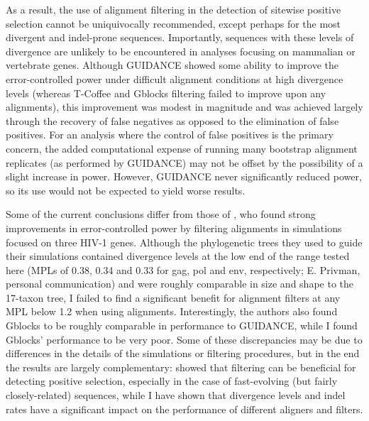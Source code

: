As a result, the use of alignment filtering in the detection of
sitewise positive selection cannot be uniquivocally recommended,
except perhaps for the most divergent and indel-prone
sequences. Importantly, sequences with these levels of divergence are
unlikely to be encountered in analyses focusing on mammalian or
vertebrate genes. Although GUIDANCE showed some ability to improve the
error-controlled power under difficult alignment conditions at high
divergence levels (whereas T-Coffee and Gblocks filtering failed to
improve upon any \prankc alignments), this improvement was modest in
magnitude and was achieved largely through the recovery of false
negatives as opposed to the elimination of false positives. For an
analysis where the control of false positives is the primary concern,
the added computational expense of running many bootstrap alignment
replicates (as performed by GUIDANCE) may not be offset by the
possibility of a slight increase in power. However, GUIDANCE never
significantly reduced power, so its use would not be expected to yield
worse results.

Some of the current conclusions differ from those of
\citet{Privman2011Improving}, who found strong improvements in
error-controlled power by filtering alignments in simulations focused
on three HIV-1 genes. Although the phylogenetic trees they used to
guide their simulations contained divergence levels at the low end of
the range tested here (MPLs of 0.38, 0.34 and 0.33 for gag, pol and
env, respectively; E. Privman, personal communication) and were
roughly comparable in size and shape to the 17-taxon tree, I failed to
find a significant benefit for alignment filters at any MPL below 1.2
when using \prankc alignments. Interestingly, the authors also found
Gblocks to be roughly comparable in performance to GUIDANCE, while I
found Gblocks' performance to be very poor. Some of these
discrepancies may be due to differences in the details of the
simulations or filtering procedures, but in the end the results are
largely complementary: \citet{Privman2011Improving} showed that
filtering can be beneficial for detecting positive selection,
especially in the case of fast-evolving (but fairly closely-related)
sequences, while I have shown that divergence levels and indel rates
have a significant impact on the performance of different aligners and
filters.


